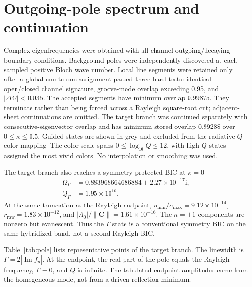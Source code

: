 \documentclass[aps,prl,reprint,superscriptaddress,nofootinbib,floatfix]{revtex4-2}
\newcommand{\ii}{\mathrm{i}}
\begin{document}
\section{Outgoing-pole spectrum and continuation}

Complex eigenfrequencies were obtained with all-channel outgoing/decaying
boundary conditions.  Background poles were independently discovered at each
sampled positive Bloch wave number.  Local line segments were retained only
after a global one-to-one assignment passed three hard tests: identical
open/closed channel signature, groove-mode overlap exceeding 0.95, and
$|\Delta\Omega|<0.035$.  The accepted segments have minimum overlap 0.99875.
They terminate rather than being forced across a Rayleigh square-root cut;
adjacent-sheet continuations are omitted.  The target branch was continued
separately with consecutive-eigenvector overlap and has minimum stored overlap
0.99288 over $0\leq\kappa\leq0.5$.  Guided states are shown in grey and
excluded from the radiative-$Q$ color mapping.  The color scale spans
$0\leq\log_{10}Q\leq12$, with high-$Q$ states assigned the most vivid colors.
No interpolation or smoothing was used.

The target branch also reaches a symmetry-protected BIC at $\kappa=0$:
\begin{equation}
 \begin{aligned}
 \Omega_{\Gamma}&=0.883968664686884+2.27\times10^{-17}\ii,\\
 Q_{\Gamma}&=1.95\times10^{16}.
 \end{aligned}
 \label{eq:s-gamma-bic}
\end{equation}
At the same truncation as the Rayleigh endpoint,
$\sigma_{\min}/\sigma_{\max}=9.12\times10^{-14}$,
$r_{\mathrm{raw}}=1.83\times10^{-12}$, and
$|A_0|/\|\bm C\|=1.61\times10^{-16}$.  The $n=\pm1$ components are nonzero but
evanescent.  Thus the $\Gamma$ state is a conventional symmetry BIC on the
same hybridized band, not a second Rayleigh BIC.

Table~\ref{tab:pole} lists representative points of the target branch.  The
linewidth is $\Gamma=2|\operatorname{Im}f_p|$.  At the endpoint, the real
part of the pole equals the Rayleigh frequency, $\Gamma=0$, and $Q$ is
infinite.  The tabulated endpoint amplitudes come from the homogeneous mode,
not from a driven reflection minimum.
\end{document}
